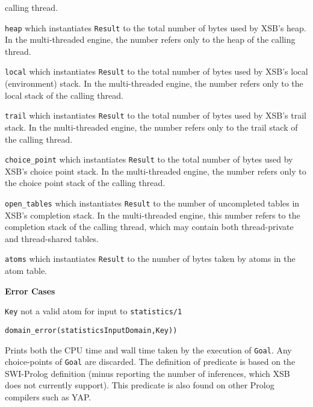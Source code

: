 \begin{description}
 calling thread.
%
\item {\tt heap} which instantiates {\tt Result} to the total number
 of bytes used by XSB's heap.  In the multi-threaded engine, the
 number refers only to the heap of the calling thread.
%
\item {\tt local} which instantiates {\tt Result} to the total number
 of bytes used by XSB's local (environment) stack.  In the
 multi-threaded engine, the number refers only to the local stack of
 the calling thread.
%
\item {\tt trail} which instantiates {\tt Result} to the total number
 of bytes used by XSB's trail stack.  In the multi-threaded engine,
 the number refers only to the trail stack of the calling thread.
%
\item {\tt choice\_point} which instantiates {\tt Result} to the total
 number of bytes used by XSB's choice point stack.  In the
 multi-threaded engine, the number refers only to the choice point
 stack of the calling thread.
%
\item {\tt open\_tables} which instantiates {\tt Result} to the number
 of uncompleted tables in XSB's completion stack.  In the
 multi-threaded engine, this number refers to the completion stack of
 the calling thread, which may contain both thread-private and
 thread-shared tables.
%
\item {\tt atoms} which instantiates {\tt Result} to the number of
 bytes taken by atoms in the atom table.
%
\ei

{\bf Error Cases}
\bi
\item {\tt Key} not a valid atom for input to {\tt statistics/1} 
\bi
\item 	{\tt domain\_error(statisticsInputDomain,Key))}
\ei
\ei
{}

%
Prints both the CPU time and wall time taken by the execution of \texttt{Goal}.
Any choice-points of \texttt{Goal} are discarded. The definition of predicate is based 
on the SWI-Prolog definition (minus reporting the number of inferences, which XSB does 
not currently support). This predicate is also found on other Prolog compilers such as YAP.

\end{description}





